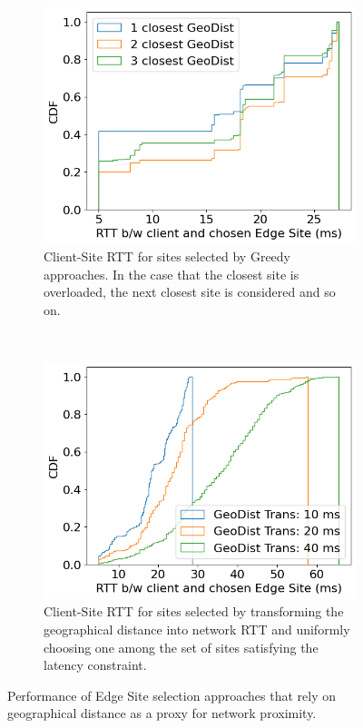 \begin{figure}[t!]
    \centering
    \begin{subfigure}[t]{0.45\textwidth}
        \centering
        \includegraphics[width=\textwidth]{figures/mechanisms/nw_proximity/geodist_greedy.png}
        \caption{Client-Site RTT for sites selected by Greedy approaches. In the case that the closest site is overloaded, the next closest site is considered and so on.}
        \label{fig:geodist_greedy}
    \end{subfigure}%
    ~ 
    \begin{subfigure}[t]{0.45\textwidth}
        \centering
        \includegraphics[width=\textwidth]{figures/mechanisms/nw_proximity/geodist_trans_rtt.png}
        \caption{Client-Site RTT for sites selected by transforming the geographical distance into network RTT and uniformly choosing one among the set of sites satisfying the latency constraint.}
        \label{fig:geodist_trans}
    \end{subfigure}
    \label{fig:baseline_proximity_policies}
    \caption{Performance of Edge Site selection approaches that rely on geographical distance as a proxy for network proximity.}
\end{figure}

